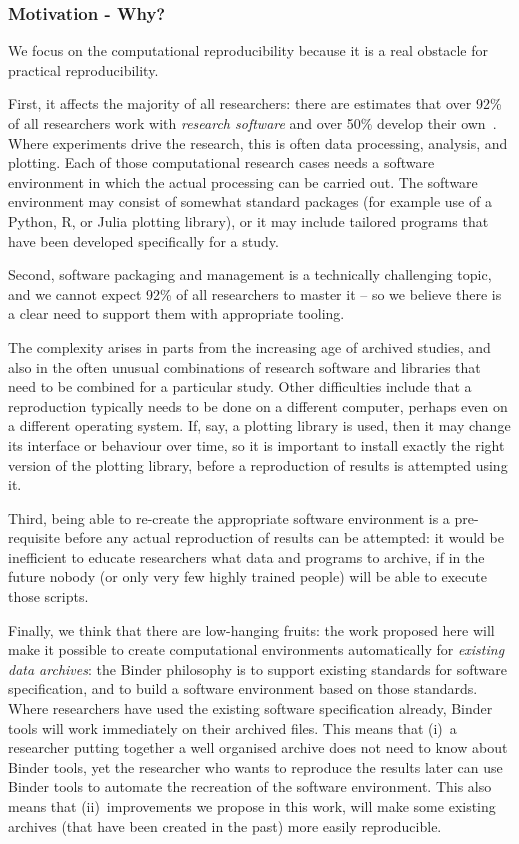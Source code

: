 \subsubsection{Motivation - Why?}\label{sec:motivation-why}

We focus on the computational reproducibility because it is a real
obstacle for practical reproducibility.

First, it affects the majority of all researchers: there are estimates that over
92\% of all researchers work with \emph{research software} and over 50\% develop
their own~\cite{Hettrick2014}. Where experiments drive the research, this is
often data processing, analysis, and plotting. Each of those computational
research cases needs a software environment in which the actual processing can
be carried out. The software environment may consist of somewhat standard
packages (for example use of a Python, R, or Julia plotting library), or it may
include tailored programs that have been developed specifically for a study.

Second, software packaging and management is a technically challenging topic,
and we cannot expect 92\% of all researchers to master it -- so we believe there
is a clear need to support them with appropriate tooling.

The complexity arises in parts from the increasing age of archived studies, and
also in the often unusual combinations of research software and libraries that
need to be combined for a particular study. Other difficulties include that a
reproduction typically needs to be done on a different computer, perhaps even on
a different operating system. If, say, a plotting library is used, then it may
change its interface or behaviour over time, so it is important to install
exactly the right version of the plotting library, before a reproduction of
results is attempted using it.

Third, being able to re-create the appropriate software environment is a
pre-requisite before any actual reproduction of results can be attempted: it
would be inefficient to educate researchers what data and programs to archive,
if in the future nobody (or only very few highly trained people) will be able to
execute those scripts.

Finally, we think that there are low-hanging fruits: the work proposed here will
make it possible to create computational environments automatically for
\emph{existing data archives}: the Binder philosophy is to support existing standards for software
specification, and to build a software environment based on those standards.
Where researchers have used the existing software specification already, Binder tools
will work immediately on their archived files. This means that (i)~a researcher
putting together a well organised archive does not need to know about Binder tools,
yet the researcher who wants to reproduce the results later can use Binder tools to
automate the recreation of the software environment. This also means that
(ii)~improvements we propose in this work, will make some existing archives (that
have been created in the past) more easily reproducible.

